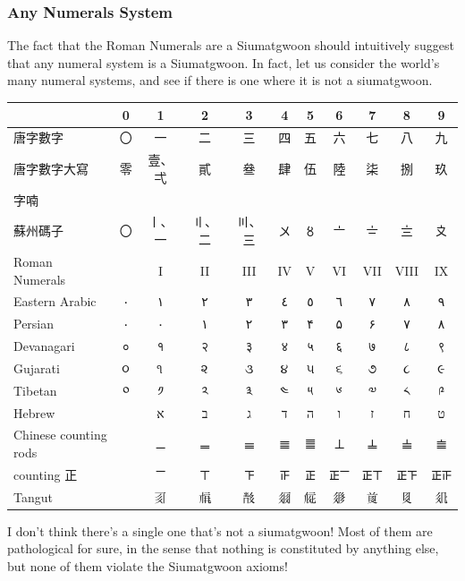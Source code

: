 \subsubsection{Any Numerals System}

The fact that the Roman Numerals are a Siumatgwoon should intuitively suggest that any numeral system is a Siumatgwoon. In fact, let us consider the world's many numeral systems, and see if there is one where it is not a siumatgwoon. 

\begin{center}
\begin{tabular}{|l|c|c|c|c|c|c|c|c|c|c|}
\hline
 & 0 & 1 & 2 & 3 & 4 & 5 & 6 & 7 & 8 & 9 \\
\hline
唐字數字 & 〇 & 一 & 二 & 三 & 四 & 五 & 六 & 七 & 八 & 九 \\
\hline
唐字數字大寫 & 零 & 壹、弌 & 貳 & 叄 & 肆 & 伍 & 陸 & 柒 & 捌 & 玖 \\
\hline
字喃 &  & 𠬠 & 𠄩 & 𠀧 & 𦊚 & 𠄼 & 𦒹 & 𦉱 & 𠔭 & 𠃩 \\
\hline
蘇州碼子 & 〇 & 〡、一 & 〢、二 & 〣、三 & 〤 & 〥 & 〦 & 〧 & 〨 & 〩 \\
\hline
Roman Numerals &  & I & II & III & IV & V & VI & VII & VIII & IX \\
\hline
Eastern Arabic & ٠ & ١ & ٢ & ٣ & ٤ & ٥ & ٦ & ٧ & ٨ & ٩ \\
\hline
Persian & ٠ & ۰ & ۱ & ۲ & ۳ & ۴ & ۵ & ۶ & ۷ & ۸ \\
\hline
Devanagari & ० & १ & २ & ३ & ४ & ५ & ६ & ७ & ८ & ९ \\
\hline
Gujarati & ૦ & ૧ & ૨ & ૩ & ૪ & ૫ & ૬ & ૭ & ૮ & ૯ \\
\hline
Tibetan & ༠ & ༡ & ༢ & ༣ & ༤ & ༥ & ༦ & ༧ & ༨ & ༩ \\
\hline
Hebrew &  & א & ב & ג & ד & ה & ו & ז & ח & ט \\
\hline
Chinese counting rods &  & 𝍠 & 𝍡 & 𝍢 & 𝍣 & 𝍤 & 𝍥 & 𝍦 & 𝍧 & 𝍨 \\
\hline
counting 正 &  & 𝍲 & 𝍳 & 𝍴 & 𝍵 & 𝍶 & 𝍶𝍲 & 𝍶𝍳 & 𝍶𝍴 & 𝍶𝍵 \\
\hline
Tangut &  & 𘈩 & 𗍫 & 𘕕 & 𗥃 & 𗏁 & 𗤁 & 𗒹 & 𘉋 & 𗢭 \\
\hline
\end{tabular}
\end{center}

I don't think there's a single one that's not a siumatgwoon! Most of them are pathological for sure, in the sense that nothing is constituted by anything else, but none of them violate the Siumatgwoon axioms! 

